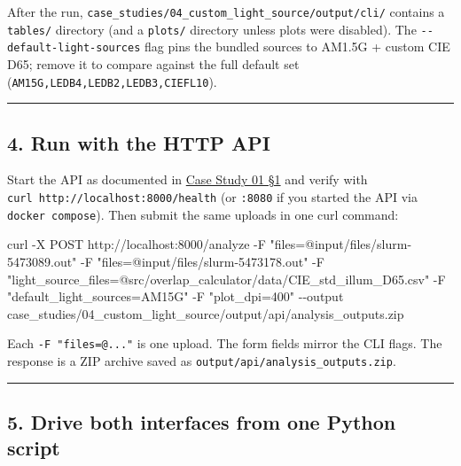 \documentclass[
  11pt,
]{article}
\newenvironment{Shaded}{}{}
\newcommand{\AttributeTok}[1]{\textcolor[rgb]{0.49,0.56,0.16}{#1}}
\newcommand{\ExtensionTok}[1]{#1}
\newcommand{\NormalTok}[1]{#1}
\newcommand{\StringTok}[1]{\textcolor[rgb]{0.25,0.44,0.63}{#1}}
\begin{document}
After the run,
\texttt{case\_studies/04\_custom\_light\_source/output/cli/} contains a
\texttt{tables/} directory (and a \texttt{plots/} directory unless plots
were disabled). The \texttt{-\/-default-light-sources} flag pins the
bundled sources to AM1.5G + custom CIE D65; remove it to compare against
the full default set (\texttt{AM15G,LEDB4,LEDB2,LEDB3,CIEFL10}).

\begin{center}\rule{0.5\linewidth}{0.5pt}\end{center}

\hypertarget{4-run-with-the-http-api}{
\subsection{4. Run with the HTTP API}\label{4-run-with-the-http-api}}

Start the API as documented in
\href{https://github.com/pinarsyt/overlap-calculator/blob/main/case_studies/01_theoretical_only/README.md\#1-prerequisites}{Case
Study 01 §1} and verify with
\texttt{curl\ http://localhost:8000/health} (or \texttt{:8080} if you
started the API via \texttt{docker\ compose}). Then submit the same
uploads in one curl command:

\begin{Shaded}
\begin{Highlighting}[]
\ExtensionTok{curl} \AttributeTok{{-}X}\NormalTok{ POST http://localhost:8000/analyze }\AttributeTok{{-}F} \StringTok{"files=@input/files/slurm{-}5473089.out"} \AttributeTok{{-}F} \StringTok{"files=@input/files/slurm{-}5473178.out"} \AttributeTok{{-}F} \StringTok{"light\_source\_files=@src/overlap\_calculator/data/CIE\_std\_illum\_D65.csv"} \AttributeTok{{-}F} \StringTok{"default\_light\_sources=AM15G"} \AttributeTok{{-}F} \StringTok{"plot\_dpi=400"} \AttributeTok{{-}{-}output}\NormalTok{ case\_studies/04\_custom\_light\_source/output/api/analysis\_outputs.zip}
\end{Highlighting}
\end{Shaded}

Each \texttt{-F\ "files=@..."} is one upload. The form fields mirror the
CLI flags. The response is a ZIP archive saved as
\texttt{output/api/analysis\_outputs.zip}.

\begin{center}\rule{0.5\linewidth}{0.5pt}\end{center}

\hypertarget{5-drive-both-interfaces-from-one-python-script}{
\subsection{5. Drive both interfaces from one Python
script}\label{5-drive-both-interfaces-from-one-python-script}}
\end{document}
